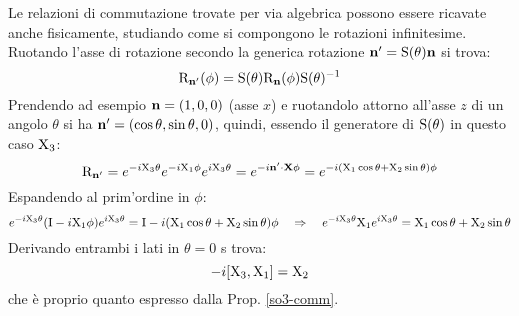 Le relazioni di commutazione trovate per via algebrica possono essere ricavate anche fisicamente, studiando come si compongono le rotazioni infinitesime. Ruotando l'asse di rotazione secondo la generica rotazione $ \mathbf{n}' = \mathrm{S}(\theta) \mathbf{n} $ si trova:
\begin{equation}
	\mathrm{R}_{\mathbf{n}'}(\phi) = \mathrm{S}(\theta) \mathrm{R}_{\mathbf{n}}(\phi) \mathrm{S}(\theta)^{-1}
	\label{eq:9.16}
\end{equation}
Prendendo ad esempio $ \mathbf{n} = (1,0,0) $ (asse $ x $) e ruotandolo attorno all'asse $ z $ di un angolo $ \theta $ si ha $ \mathbf{n}' = (\cos \theta, \sin \theta, 0) $, quindi, essendo il generatore di $ \mathrm{S}(\theta) $ in questo caso $ \mathrm{X}_3 $:
\begin{equation*}
	\mathrm{R}_{\mathbf{n}'} = e^{-i \mathrm{X}_3 \theta} e^{-i \mathrm{X}_1 \phi} e^{i \mathrm{X}_3 \theta} = e^{-i \mathbf{n}' \cdot \mathbf{X} \phi} = e^{-i (\mathrm{X}_1 \cos \theta + \mathrm{X}_2 \sin \theta) \phi}
\end{equation*}
Espandendo al prim'ordine in $ \phi $:
\begin{equation*}
	e^{-i \mathrm{X}_3 \theta} (\mathrm{I} - i \mathrm{X}_1 \phi) e^{i \mathrm{X}_3 \theta} = \mathrm{I} - i (\mathrm{X}_1 \cos \theta + \mathrm{X}_2 \sin \theta) \phi
	\quad \Rightarrow \quad
	e^{-i \mathrm{X}_3 \theta} \mathrm{X}_1 e^{i \mathrm{X}_3 \theta} = \mathrm{X}_1 \cos \theta + \mathrm{X}_2 \sin \theta
\end{equation*}
Derivando entrambi i lati in $ \theta = 0 $ s trova:
\begin{equation*}
	-i [\mathrm{X}_3, \mathrm{X}_1] = \mathrm{X}_2
\end{equation*}
che è proprio quanto espresso dalla Prop. \ref{so3-comm}.










